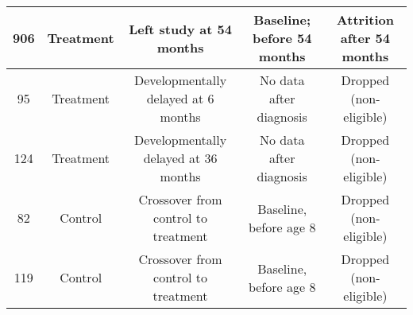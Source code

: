 \begin{sidewaystable}[H]
\begin{threeparttable}
\begin{tabular}{ccccc}
906 & Treatment  & Left study at 54 months & Baseline; before 54 months & Attrition after 54 months \\ \midrule
95   & Treatment       & Developmentally delayed at 6 months & No data after diagnosis & Dropped (non-eligible) \\ 
124 & Treatment       & Developmentally delayed at 36 months & No data after diagnosis & Dropped (non-eligible) \\ \midrule
 82 & Control       & Crossover from control to treatment & Baseline, before age 8 & Dropped (non-eligible)  \\ 
 119 & Control       & Crossover from control to treatment & Baseline, before age 8 & Dropped (non-eligible)  \\ \bottomrule
\end{tabular}
\end{threeparttable}
\end{sidewaystable}